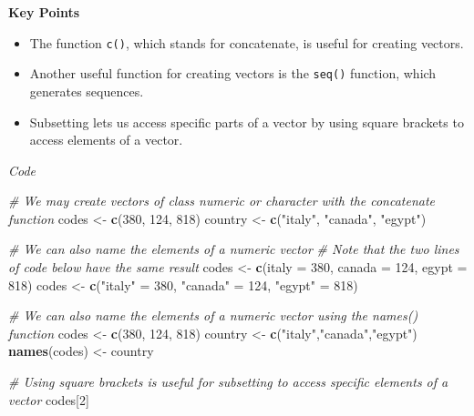 \documentclass[]{article}
\newenvironment{Shaded}{\begin{snugshade}}{\end{snugshade}}
\newcommand{\CommentTok}[1]{\textcolor[rgb]{0.56,0.35,0.01}{\textit{#1}}}
\newcommand{\DataTypeTok}[1]{\textcolor[rgb]{0.13,0.29,0.53}{#1}}
\newcommand{\DecValTok}[1]{\textcolor[rgb]{0.00,0.00,0.81}{#1}}
\newcommand{\KeywordTok}[1]{\textcolor[rgb]{0.13,0.29,0.53}{\textbf{#1}}}
\newcommand{\NormalTok}[1]{#1}
\newcommand{\StringTok}[1]{\textcolor[rgb]{0.31,0.60,0.02}{#1}}
\providecommand{\tightlist}{%
  \setlength{\itemsep}{0pt}\setlength{\parskip}{0pt}}
\begin{document}
\textbf{Key Points}

\begin{itemize}
\tightlist
\item
  The function \texttt{c()}, which stands for concatenate, is useful for
  creating vectors.
\item
  Another useful function for creating vectors is the \texttt{seq()}
  function, which generates sequences.
\item
  Subsetting lets us access specific parts of a vector by using square
  brackets to access elements of a vector.
\end{itemize}

\emph{Code}

\begin{Shaded}
\begin{Highlighting}[]
\CommentTok{# We may create vectors of class numeric or character with the concatenate function}
\NormalTok{codes <-}\StringTok{ }\KeywordTok{c}\NormalTok{(}\DecValTok{380}\NormalTok{, }\DecValTok{124}\NormalTok{, }\DecValTok{818}\NormalTok{)}
\NormalTok{country <-}\StringTok{ }\KeywordTok{c}\NormalTok{(}\StringTok{"italy"}\NormalTok{, }\StringTok{"canada"}\NormalTok{, }\StringTok{"egypt"}\NormalTok{)}

\CommentTok{# We can also name the elements of a numeric vector}
\CommentTok{# Note that the two lines of code below have the same result}
\NormalTok{codes <-}\StringTok{ }\KeywordTok{c}\NormalTok{(}\DataTypeTok{italy =} \DecValTok{380}\NormalTok{, }\DataTypeTok{canada =} \DecValTok{124}\NormalTok{, }\DataTypeTok{egypt =} \DecValTok{818}\NormalTok{)}
\NormalTok{codes <-}\StringTok{ }\KeywordTok{c}\NormalTok{(}\StringTok{"italy"}\NormalTok{ =}\StringTok{ }\DecValTok{380}\NormalTok{, }\StringTok{"canada"}\NormalTok{ =}\StringTok{ }\DecValTok{124}\NormalTok{, }\StringTok{"egypt"}\NormalTok{ =}\StringTok{ }\DecValTok{818}\NormalTok{)}

\CommentTok{# We can also name the elements of a numeric vector using the names() function}
\NormalTok{codes <-}\StringTok{ }\KeywordTok{c}\NormalTok{(}\DecValTok{380}\NormalTok{, }\DecValTok{124}\NormalTok{, }\DecValTok{818}\NormalTok{)}
\NormalTok{country <-}\StringTok{ }\KeywordTok{c}\NormalTok{(}\StringTok{"italy"}\NormalTok{,}\StringTok{"canada"}\NormalTok{,}\StringTok{"egypt"}\NormalTok{)}
\KeywordTok{names}\NormalTok{(codes) <-}\StringTok{ }\NormalTok{country}

\CommentTok{# Using square brackets is useful for subsetting to access specific elements of a vector}
\NormalTok{codes[}\DecValTok{2}\NormalTok{]}
\end{Highlighting}
\end{Shaded}
\end{document}
